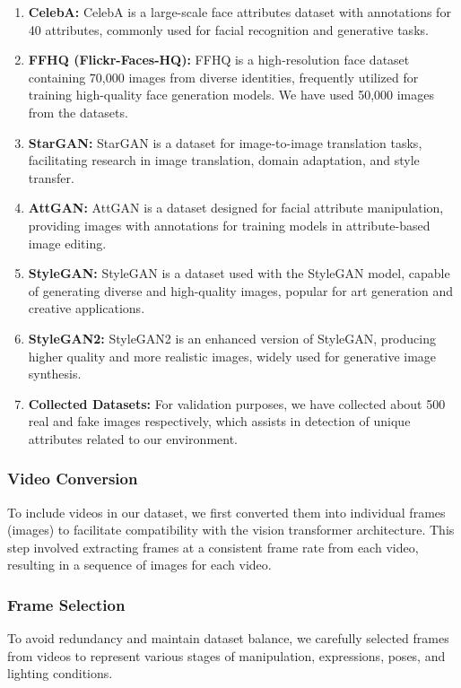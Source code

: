 \begin{enumerate}
    \item \textbf{CelebA:} CelebA is a large-scale face attributes dataset with annotations for 40 attributes, commonly used for facial recognition and generative tasks.

    \item \textbf{FFHQ (Flickr-Faces-HQ):} FFHQ is a high-resolution face dataset containing 70,000 images from diverse identities, frequently utilized for training high-quality face generation models. We have used 50,000 images from the datasets.

    \item \textbf{StarGAN:} StarGAN is a dataset for image-to-image translation tasks, facilitating research in image translation, domain adaptation, and style transfer.

    \item \textbf{AttGAN:} AttGAN is a dataset designed for facial attribute manipulation, providing images with annotations for training models in attribute-based image editing.

    \item \textbf{StyleGAN:} StyleGAN is a dataset used with the StyleGAN model, capable of generating diverse and high-quality images, popular for art generation and creative applications.

    \item \textbf{StyleGAN2:} StyleGAN2 is an enhanced version of StyleGAN, producing higher quality and more realistic images, widely used for generative image synthesis.
    
    \item \textbf{Collected Datasets:} For validation purposes, we have collected about 500 real and fake images respectively, which assists in detection of unique attributes related to our environment.

\end{enumerate}


\subsubsection{Video Conversion}
To include videos in our dataset, we first converted them into individual frames (images) to facilitate compatibility with the vision transformer architecture. This step involved extracting frames at a consistent frame rate from each video, resulting in a sequence of images for each video.
\subsubsection{Frame Selection}
To avoid redundancy and maintain dataset balance, we carefully selected frames from videos to represent various stages of manipulation, expressions, poses, and lighting conditions.

